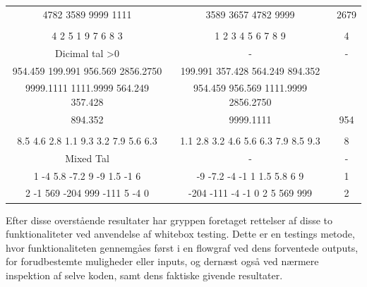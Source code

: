 \documentclass[11pt]{article}
\begin{document}
\begin{center}
\begin{tabular}{ |c|c|c| }
              4782 3589 9999 1111 & 3589 3657 4782 9999 & 2679\\
              &&\\
              4 2 5 1 9 7 6 8 3 & 1 2 3 4 5 6 7 8 9 & 4 \\
             Dicimal tal \textgreater 0 & - & - \\
              954.459 199.991 956.569 2856.2750 & 199.991 357.428 564.249 894.352 & \\ 
              9999.1111 1111.9999 564.249 357.428 & 954.459 956.569 1111.9999 2856.2750 & \\ 
              894.352 & 9999.1111 & 954\\ 
              &&\\
              8.5 4.6 2.8 1.1 9.3 3.2 7.9 5.6 6.3 & 1.1 2.8 3.2 4.6 5.6 6.3 7.9 8.5 9.3 & 8\\ 
             Mixed Tal & - & -\\
              1 -4 5.8 -7.2 9 -9 1.5 -1 6 & -9 -7.2 -4 -1 1 1.5 5.8 6 9 & 1 \\
              2 -1  569 -204 999 -111 5 -4 0 & -204 -111 -4 -1 0 2 5 569 999 & 2\\
             \hline
        \end{tabular}
    \end{center}
    
    \newpage \noindent
    Efter disse overstående resultater har gryppen foretaget rettelser af disse to funktionaliteter ved anvendelse af whitebox testing. Dette er en testings metode, hvor funktionaliteten gennemgåes først i en flowgraf ved dens forventede outputs, for forudbestemte muligheder eller inputs, og dernæst også ved nærmere inspektion af selve koden, samt dens faktiske givende resultater.
    
\end{document}
